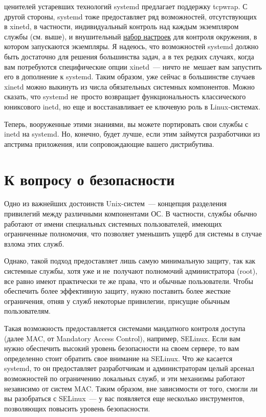 \documentclass[10pt,oneside,a4paper]{article}
\begin{document}
ценителей устаревших технологий systemd предлагает поддержку tcpwrap.  С другой
стороны, systemd тоже предоставляет ряд возможностей, отсутствующих в xinetd, в
частности, индивидуальный контроль над каждым экземпляром службы (см.  выше), и
внушительный
\href{http://0pointer.de/public/systemd-man/systemd.exec.html}{набор настроек}
для контроля окружения, в котором запускаются экземпляры. Я надеюсь, что
возможностей systemd должно быть достаточно для решения большинства задач, а в
тех редких случаях, когда вам потребуются специфические опции xinetd~--- ничто
не~мешает вам запустить его в дополнение к systemd. Таким образом, уже сейчас в
большинстве случаев xinetd можно выкинуть из числа обязательных системных
компонентов. Можно сказать, что systemd не~просто возвращает функциональность
классического юниксового inetd, но еще и восстанавливает ее ключевую
роль в Linux-системах.

Теперь, вооруженные этими знаниями, вы можете портировать свои службы с inetd на
systemd. Но, конечно, будет лучше, если этим займутся разработчики из апстрима
приложения, или сопровождающие вашего дистрибутива.

\section{К вопросу о безопасности}
\label{sec:security}

Одно из важнейших достоинств Unix-систем~--- концепция разделения привилегий
между различными компонентами ОС. В частности, службы обычно работают от имени
специальных системных пользователей, имеющих ограниченные полномочия, что
позволяет уменьшить ущерб для системы в случае взлома этих служб.

Однако, такой подход предоставляет лишь самую минимальную защиту, так как
системные службы, хотя уже и не~получают полномочий администратора (root), все
равно имеют практически те же права, что и обычные пользователи. Чтобы
обеспечить более эффективную защиту, нужно поставить более жесткие ограничения,
отняв у служб некоторые привилегии, присущие обычным пользователям.

Такая возможность предоставляется системами мандатного контроля доступа (далее
MAC, от Mandatory Access Control), например, SELinux. Если вам нужно обеспечить
высокий уровень безопасности на своем сервере, то вам определенно стоит обратить
свое внимание на SELinux. Что же касается systemd, то он предоставляет
разработчикам и администраторам целый арсенал возможностей по ограничению
локальных служб, и эти механизмы работают независимо от систем MAC.  Таким
образом, вне зависимости от того, смогли ли вы разобраться с SELinux~--- у вас
появляется еще несколько инструментов, позволяющих повысить уровень
безопасности.
\end{document}
